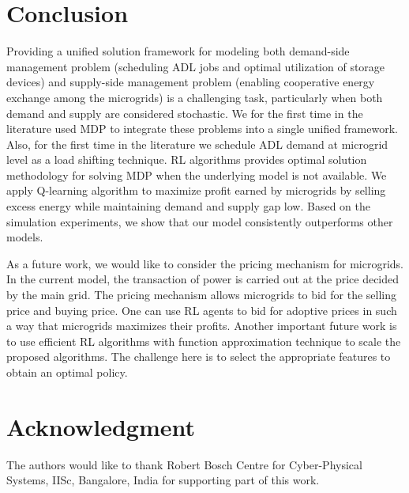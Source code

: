\documentclass[conference]{IEEEtran}
\begin{document}
\section{Conclusion}\label{sec:conclusion}
Providing a unified solution framework for modeling both demand-side management problem (scheduling ADL jobs and optimal utilization of storage devices) and supply-side management problem (enabling cooperative energy exchange among the microgrids) is a challenging task, particularly when both demand and supply are considered stochastic. We for the first time in the literature used MDP to integrate these problems into a single unified framework. Also, for the first time in the literature we schedule ADL demand at microgrid level as a load shifting technique. RL algorithms provides optimal solution methodology for solving MDP when the underlying model is not available. We apply Q-learning algorithm to maximize profit earned by microgrids by selling excess energy while maintaining demand and supply gap low. Based on the simulation experiments, we show that our model consistently outperforms other models.

As a future work, we would like to consider the pricing mechanism for microgrids. In the current model, the transaction of power is carried out at the price decided by the main grid. The pricing mechanism allows microgrids to bid for the selling price and buying price. One can use RL agents to bid for adoptive prices in such a way that microgrids maximizes their profits. Another important future work is to use efficient RL algorithms with function approximation technique to scale the proposed algorithms. The challenge here is to select the appropriate features to obtain an optimal policy.

\section*{Acknowledgment}

The authors would like to thank Robert Bosch Centre for Cyber-Physical Systems, IISc, Bangalore, India for supporting part of this work.


 
 
\end{document}

